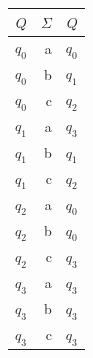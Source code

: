 {\center
\begin{tabular}{|r|r||r|}
\hline
$Q$    & $\Sigma$           & $Q$ \\ \hline
$q_0$    & a                  & $q_0$       \\
$q_0$    & b                  & $q_1$       \\
$q_0$    & c                  & $q_2$       \\
$q_1$    & a                  & $q_3$       \\
$q_1$    & b                  & $q_1$       \\
$q_1$    & c                  & $q_2$       \\
$q_2$    & a                  & $q_0$       \\
$q_2$    & b                  & $q_0$       \\
$q_2$    & c                  & $q_3$       \\
$q_3$    & a                  & $q_3$       \\
$q_3$    & b                  & $q_3$       \\
$q_3$    & c                  & $q_3$       \\
\hline
\end{tabular}
}

